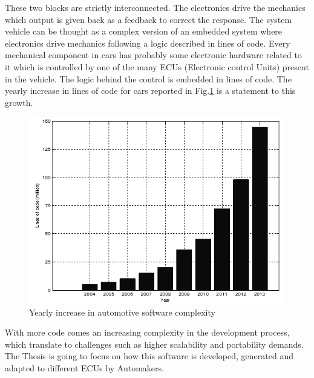\documentclass[../main.tex]{subfiles}
\begin{document}
These two blocks are strictly interconnected. The electronics drive the mechanics which output is given back as a feedback to correct the response. The system vehicle can be thought as a complex version of an embedded system where electronics drive mechanics following a logic described in lines of code.
Every mechanical component in cars has probably some electronic hardware related to it which is controlled by one of the many ECUs (Electronic control Units) present in the vehicle. The logic behind the control is embedded in lines of code. The yearly increase in lines of code for cars reported in Fig.\ref{fig:yearlyincreas} is a statement to this growth. 
\begin{figure}[H]
    \centering
    \includegraphics[width=0.6\linewidth]{images_folder/Yearly-increase-in-automotive-software-complexity-shown-by-million-lines-of-code-of-1-ConvertImage.png}
    \caption{Yearly increase in automotive software complexity}
    \label{fig:yearlyincreas}
\end{figure}
With more code comes an increasing complexity in the development process, which translate to challenges such as higher scalability and portability demands. The Thesis is going to focus on how this software is developed, generated and adapted to different ECUs by Automakers.
\end{document}

